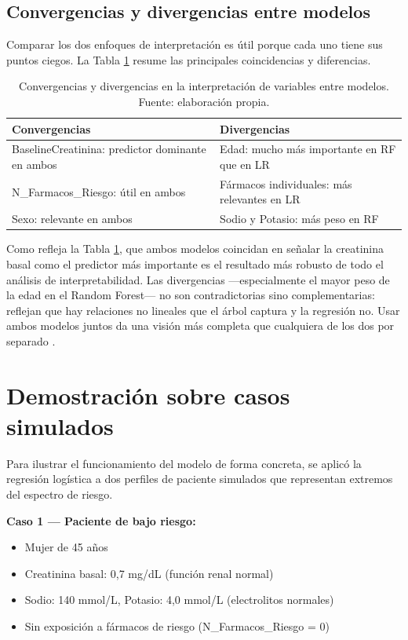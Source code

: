 \documentclass[12pt, a4paper, oneside]{report}
\begin{document}
\subsection{Convergencias y divergencias entre modelos}

Comparar los dos enfoques de interpretación es útil porque cada uno tiene sus puntos ciegos. La Tabla \ref{tab:convergencia} resume las principales coincidencias y diferencias.

\begin{table}[h]
\centering
\begin{tabular}{p{5cm}p{5cm}}
\hline
\textbf{Convergencias} & \textbf{Divergencias} \\
\hline
BaselineCreatinina: predictor dominante en ambos & Edad: mucho más importante en RF que en LR \\
N\_Farmacos\_Riesgo: útil en ambos & Fármacos individuales: más relevantes en LR \\
Sexo: relevante en ambos & Sodio y Potasio: más peso en RF \\
\hline
\end{tabular}
\caption{Convergencias y divergencias en la interpretación de variables entre modelos. Fuente: elaboración propia.}
\label{tab:convergencia}
\end{table}

Como refleja la Tabla \ref{tab:convergencia}, que ambos modelos coincidan en señalar la creatinina basal como el predictor más importante es el resultado más robusto de todo el análisis de interpretabilidad. Las divergencias —especialmente el mayor peso de la edad en el Random Forest— no son contradictorias sino complementarias: reflejan que hay relaciones no lineales que el árbol captura y la regresión no. Usar ambos modelos juntos da una visión más completa que cualquiera de los dos por separado \parencite{steyerberg2014validation}.

\section{Demostración sobre casos simulados}

Para ilustrar el funcionamiento del modelo de forma concreta, se aplicó la regresión logística a dos perfiles de paciente simulados que representan extremos del espectro de riesgo.

\textbf{Caso 1 — Paciente de bajo riesgo:}
\begin{itemize}
    \item Mujer de 45 años
    \item Creatinina basal: 0,7 mg/dL (función renal normal)
    \item Sodio: 140 mmol/L, Potasio: 4,0 mmol/L (electrolitos normales)
    \item Sin exposición a fármacos de riesgo (N\_Farmacos\_Riesgo = 0)
\end{itemize}
\end{document}
